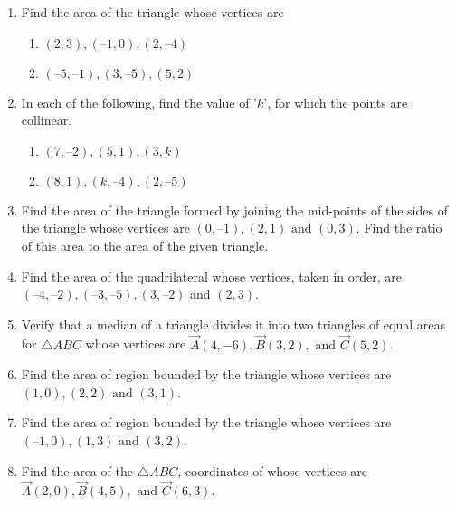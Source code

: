 \documentclass[12pt]{article}
\begin{document}
\fi
\begin{enumerate}[label=\thesection.\arabic*,ref=\thesection.\theenumi]
\item Find the area of the triangle whose vertices are 
\begin{enumerate}
\item $(2, 3), (–1, 0), (2, – 4)$
\item $(–5, –1), (3, –5), (5, 2)$ 
\end{enumerate}
		\label{10/7/3/1}
\solution
		

\item In each of the following, find the value of '$k$', for which the points are collinear.
\begin{enumerate}
\item $(7, –2), (5, 1), (3, k)$
\item $(8, 1), (k, – 4), (2, –5)$
\end{enumerate}

\item Find the area of the triangle formed by joining the mid-points of the sides of the triangle whose vertices are $(0, –1), (2, 1) \text{ and } (0, 3)$. Find the ratio of this area to the area of the given triangle.

\item Find the area of the quadrilateral whose vertices, taken in order, are $(– 4, – 2), (– 3, – 5), (3, – 2)$  and $ (2, 3)$.

\item Verify that a median of a triangle divides it into two triangles of equal areas for $\triangle ABC$ whose vertices are $\vec{A}(4, -6), \vec{B}(3, 2), \text{ and } \vec{C}(5, 2)$. 

\item Find the area of region bounded by the triangle whose
	vertices are $(1, 0), (2, 2) \text{ and } (3, 1)$. 
\item Find the area of region bounded by the triangle whose vertices
	are $(– 1, 0), (1, 3) \text{ and } (3, 2)$. 

\item Find the area of the $\triangle ABC$, coordinates of whose vertices are $\vec{A}(2, 0), \vec{B}(4, 5), \text{ and } \vec{C}(6, 3)$.

\end{enumerate}
\end{document}

